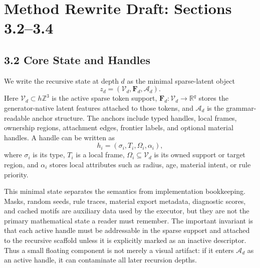 \section*{Method Rewrite Draft: Sections 3.2--3.4}

\subsection*{3.2 Core State and Handles}

We write the recursive state at depth \(d\) as the minimal sparse-latent object
\begin{equation}
z_d=(\mathcal V_d,\mathbf F_d,\mathcal A_d).
\end{equation}
Here \(\mathcal V_d\subset h\mathbb Z^3\) is the active sparse token support,
\(\mathbf F_d:\mathcal V_d\rightarrow\mathbb R^q\) stores the generator-native
latent features attached to those tokens, and \(\mathcal A_d\) is the
grammar-readable anchor structure. The anchors include typed handles, local
frames, ownership regions, attachment edges, frontier labels, and optional
material handles. A handle can be written as
\begin{equation}
h_i=(\sigma_i,T_i,\Omega_i,\alpha_i),
\end{equation}
where \(\sigma_i\) is its type, \(T_i\) is a local frame, \(\Omega_i\subseteq
\mathcal V_d\) is its owned support or target region, and \(\alpha_i\) stores
local attributes such as radius, age, material intent, or rule priority.

This minimal state separates the semantics from implementation bookkeeping.
Masks, random seeds, rule traces, material export metadata, diagnostic scores,
and cached motifs are auxiliary data used by the executor, but they are not the
primary mathematical state a reader must remember. The important invariant is
that each active handle must be addressable in the sparse support and attached
to the recursive scaffold unless it is explicitly marked as an inactive
descriptor. Thus a small floating component is not merely a visual artifact: if
it enters \(\mathcal A_d\) as an active handle, it can contaminate all later
recursion depths.


